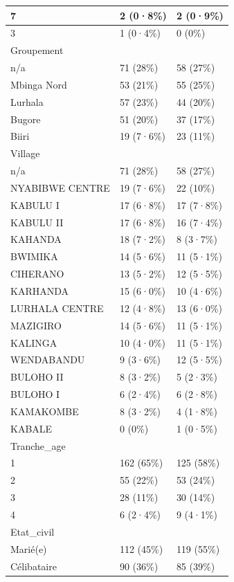 \documentclass[
]{book}
\begin{document}
\begin{tabular}{l|l|l}
7 & 2 (0·8\%) & 2 (0·9\%)\\
\hline
3 & 1 (0·4\%) & 0 (0\%)\\
\hline
Groupement &  & \\
\hline
n/a & 71 (28\%) & 58 (27\%)\\
\hline
Mbinga Nord & 53 (21\%) & 55 (25\%)\\
\hline
Lurhala & 57 (23\%) & 44 (20\%)\\
\hline
Bugore & 51 (20\%) & 37 (17\%)\\
\hline
Biiri & 19 (7·6\%) & 23 (11\%)\\
\hline
Village &  & \\
\hline
n/a & 71 (28\%) & 58 (27\%)\\
\hline
NYABIBWE CENTRE & 19 (7·6\%) & 22 (10\%)\\
\hline
KABULU I & 17 (6·8\%) & 17 (7·8\%)\\
\hline
KABULU II & 17 (6·8\%) & 16 (7·4\%)\\
\hline
KAHANDA & 18 (7·2\%) & 8 (3·7\%)\\
\hline
BWIMIKA & 14 (5·6\%) & 11 (5·1\%)\\
\hline
CIHERANO & 13 (5·2\%) & 12 (5·5\%)\\
\hline
KARHANDA & 15 (6·0\%) & 10 (4·6\%)\\
\hline
LURHALA CENTRE & 12 (4·8\%) & 13 (6·0\%)\\
\hline
MAZIGIRO & 14 (5·6\%) & 11 (5·1\%)\\
\hline
KALINGA & 10 (4·0\%) & 11 (5·1\%)\\
\hline
WENDABANDU & 9 (3·6\%) & 12 (5·5\%)\\
\hline
BULOHO II & 8 (3·2\%) & 5 (2·3\%)\\
\hline
BULOHO I & 6 (2·4\%) & 6 (2·8\%)\\
\hline
KAMAKOMBE & 8 (3·2\%) & 4 (1·8\%)\\
\hline
KABALE & 0 (0\%) & 1 (0·5\%)\\
\hline
Tranche\_age &  & \\
\hline
1 & 162 (65\%) & 125 (58\%)\\
\hline
2 & 55 (22\%) & 53 (24\%)\\
\hline
3 & 28 (11\%) & 30 (14\%)\\
\hline
4 & 6 (2·4\%) & 9 (4·1\%)\\
\hline
Etat\_civil &  & \\
\hline
Marié(e) & 112 (45\%) & 119 (55\%)\\
\hline
Célibataire & 90 (36\%) & 85 (39\%)\\

\end{tabular}
\end{document}
